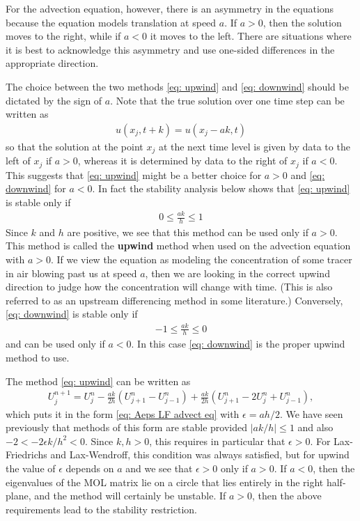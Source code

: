 For the advection equation, however, there is an asymmetry in the equations because the equation models translation at speed $a$. If $a>0$, then the solution moves to the right, while if $a<0$ it moves to the left. There are situations where it is best to acknowledge this asymmetry and use one-sided differences in the appropriate direction.

The choice between the two methods \eqref{eq: upwind} and \eqref{eq: downwind} should be dictated by the sign of $a$. Note that the true solution over one time step can be written as
\begin{align*}
u\left(x_j, t+k\right)=u\left(x_j-a k, t\right)
\end{align*}
so that the solution at the point $x_j$ at the next time level is given by data to the left of $x_j$ if $a>0$, whereas it is determined by data to the right of $x_j$ if $a<0$. This suggests that \eqref{eq: upwind} might be a better choice for $a>0$ and \eqref{eq: downwind} for $a<0$.
In fact the stability analysis below shows that \eqref{eq: upwind} is stable only if
\begin{align*}
0 \leq \frac{a k}{h} \leq 1
\end{align*}
Since $k$ and $h$ are positive, we see that this method can be used only if $a>0$. This method is called the \textbf{upwind} method when used on the advection equation with $a>0$. If we view the equation as modeling the concentration of some tracer in air blowing past us at speed $a$, then we are looking in the correct upwind direction to judge how the concentration will change with time. (This is also referred to as an upstream differencing method in some literature.)
Conversely, \eqref{eq: downwind} is stable only if
\begin{align*}
-1 \leq \frac{a k}{h} \leq 0
\end{align*}
and can be used only if $a<0$. In this case \eqref{eq: downwind} is the proper upwind method to use.

The method \eqref{eq: upwind} can be written as
\begin{align*}
U_j^{n+1}=U_j^n-\frac{a k}{2 h}\left(U_{j+1}^n-U_{j-1}^n\right)+\frac{a k}{2 h}\left(U_{j+1}^n-2 U_j^n+U_{j-1}^n\right),
\end{align*}
which puts it in the form \eqref{eq: Aeps LF advect eq} with $\epsilon=a h / 2$. We have seen previously that methods of this form are stable provided $|a k / h| \leq 1$ and also $-2<-2 \epsilon k / h^2<0$. Since $k, h>0$, this requires in particular that $\epsilon>0$. For Lax-Friedrichs and Lax-Wendroff, this condition was always satisfied, but for upwind the value of $\epsilon$ depends on $a$ and we see that $\epsilon>0$ only if $a>0$. If $a<0$, then the eigenvalues of the MOL matrix lie on a circle that lies entirely in the right half-plane, and the method will certainly be unstable. If $a>0$, then the above requirements lead to the stability restriction.

